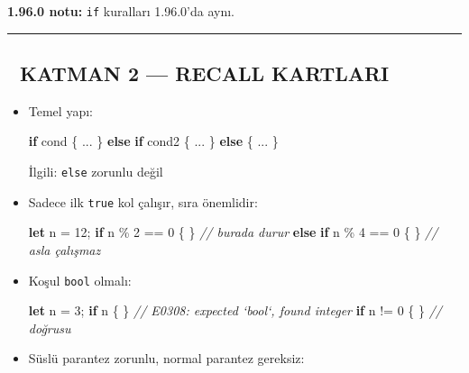 \documentclass[12pt,a4paper]{article}
\newenvironment{Shaded}{}{}
\newcommand{\CommentTok}[1]{\textcolor[rgb]{0.38,0.63,0.69}{\textit{#1}}}
\newcommand{\ControlFlowTok}[1]{\textcolor[rgb]{0.00,0.44,0.13}{\textbf{#1}}}
\newcommand{\DecValTok}[1]{\textcolor[rgb]{0.25,0.63,0.44}{#1}}
\newcommand{\KeywordTok}[1]{\textcolor[rgb]{0.00,0.44,0.13}{\textbf{#1}}}
\newcommand{\NormalTok}[1]{#1}
\newcommand{\OperatorTok}[1]{\textcolor[rgb]{0.40,0.40,0.40}{#1}}
\begin{document}
\textbf{1.96.0 notu:} \texttt{if} kuralları 1.96.0'da aynı.

\begin{center}\rule{0.5\linewidth}{0.5pt}\end{center}

\subsection{🔵 KATMAN 2 --- RECALL KARTLARI}\label{katman-2-—-recall-kartlari-6}

\begin{itemize}
\item
  Temel yapı:

\begin{Shaded}
\begin{Highlighting}[]
\ControlFlowTok{if}\NormalTok{ cond }\OperatorTok{\{} \OperatorTok{...} \OperatorTok{\}} \ControlFlowTok{else} \ControlFlowTok{if}\NormalTok{ cond2 }\OperatorTok{\{} \OperatorTok{...} \OperatorTok{\}} \ControlFlowTok{else} \OperatorTok{\{} \OperatorTok{...} \OperatorTok{\}}
\end{Highlighting}
\end{Shaded}


  İlgili: \texttt{else} zorunlu değil
\item
  Sadece ilk \texttt{true} kol çalışır, sıra önemlidir:

\begin{Shaded}
\begin{Highlighting}[]
\KeywordTok{let}\NormalTok{ n }\OperatorTok{=} \DecValTok{12}\OperatorTok{;}
\ControlFlowTok{if}\NormalTok{ n }\OperatorTok{\%} \DecValTok{2} \OperatorTok{==} \DecValTok{0} \OperatorTok{\{} \OperatorTok{\}}      \CommentTok{// burada durur}
\ControlFlowTok{else} \ControlFlowTok{if}\NormalTok{ n }\OperatorTok{\%} \DecValTok{4} \OperatorTok{==} \DecValTok{0} \OperatorTok{\{} \OperatorTok{\}} \CommentTok{// asla çalışmaz}
\end{Highlighting}
\end{Shaded}
\item
  Koşul \texttt{bool} olmalı:

\begin{Shaded}
\begin{Highlighting}[]
\KeywordTok{let}\NormalTok{ n }\OperatorTok{=} \DecValTok{3}\OperatorTok{;}
\ControlFlowTok{if}\NormalTok{ n }\OperatorTok{\{} \OperatorTok{\}}         \CommentTok{// E0308: expected `bool`, found integer}
\ControlFlowTok{if}\NormalTok{ n }\OperatorTok{!=} \DecValTok{0} \OperatorTok{\{} \OperatorTok{\}}    \CommentTok{// doğrusu}
\end{Highlighting}
\end{Shaded}
\item
  Süslü parantez zorunlu, normal parantez gereksiz:


\end{itemize}
\end{document}
